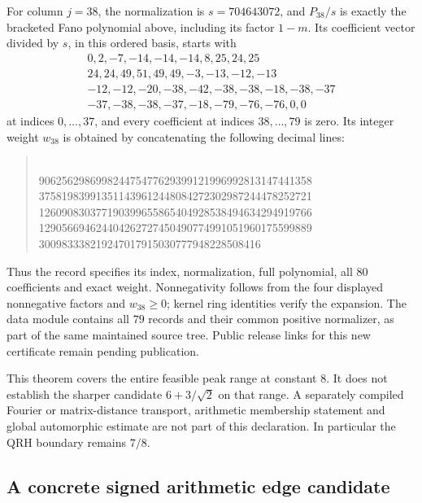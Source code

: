 \documentclass[11pt]{article}
\begin{document}
For column \(j=38\), the normalization is \(s=704643072\), and
\(P_{38}/s\) is exactly the bracketed Fano polynomial above, including
its factor \(1-m\). Its coefficient vector divided by \(s\), in this
ordered basis, starts with
\[
 \begin{gathered}
0,2,-7,-14,-14,-14,8,25,24,25\\
24,24,49,51,49,49,-3,-13,-12,-13\\
-12,-12,-20,-38,-42,-38,-38,-18,-38,-37\\
-37,-38,-38,-37,-18,-79,-76,-76,0,0
 \end{gathered}
\]
at indices \(0,\ldots,37\), and every coefficient at indices
\(38,\ldots,79\) is zero. Its integer weight \(w_{38}\) is obtained
by concatenating the following decimal lines:
\begin{quote}\small{}\\
906256298699824475477629399121996992813147441358\\
375819839913511439612448084272302987244478252721\\
126090830377190399655865404928538494634294919766\\
129056694624404262727450490774991051960175599889\\
300983338219247017915030777948228508416
\end{quote}
Thus the record specifies its index, normalization, full polynomial,
all \(80\) coefficients and exact weight. Nonnegativity follows from
the four displayed nonnegative factors and \(w_{38}\ge0\); kernel
ring identities verify the expansion. The data module contains all
\(79\) records and their common positive normalizer, as part of the
same maintained source tree. Public release links for this new
certificate remain pending publication.

This theorem covers the entire feasible peak range at constant \(8\).
It does not establish the sharper candidate \(6+3/\sqrt2\) on that
range. A separately compiled Fourier or matrix-distance transport,
arithmetic membership statement and global automorphic estimate are
not part of this declaration. In particular the QRH boundary remains
\(7/8\).

\subsection{A concrete signed arithmetic edge candidate}
\end{document}
